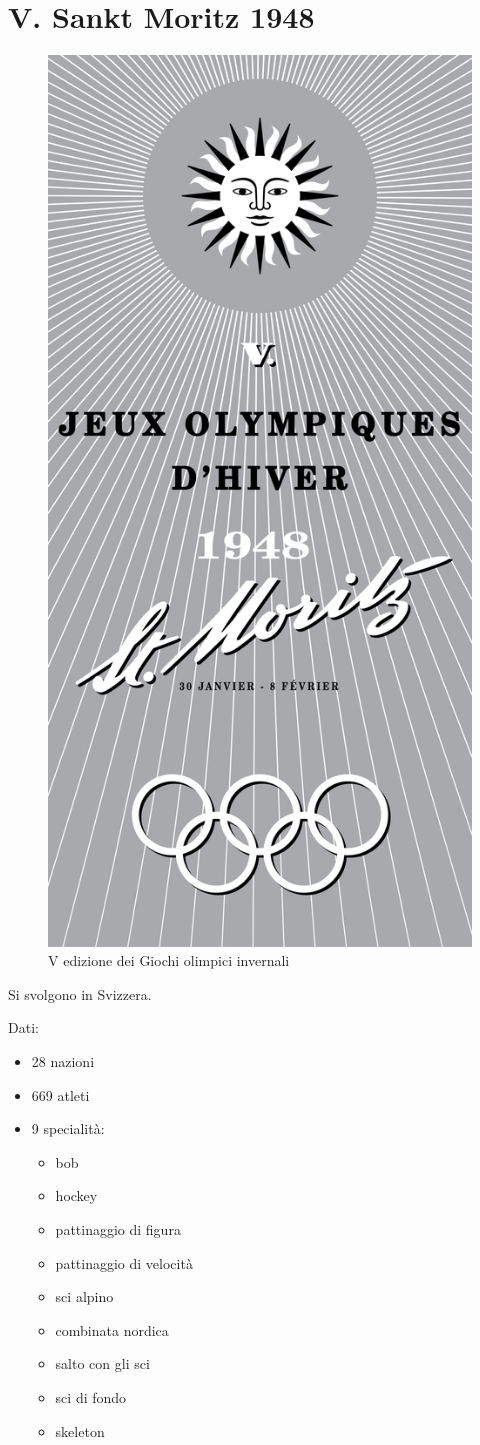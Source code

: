 \documentclass[
]{book}
\providecommand{\tightlist}{%
  \setlength{\itemsep}{0pt}\setlength{\parskip}{0pt}}
\begin{document}
\chapter*{V. Sankt Moritz 1948}\label{v.-sankt-moritz-1948}

\begin{figure}
\includegraphics[width=0.4\linewidth]{images/loghi/1948} \caption{V edizione dei Giochi olimpici invernali}\label{fig:unnamed-chunk-13}
\end{figure}

Si svolgono in Svizzera.

Dati:

\begin{itemize}
\tightlist
\item
  28 nazioni
\item
  669 atleti
\item
  9 specialità:

  \begin{itemize}
  \tightlist
  \item
    bob
  \item
    hockey
  \item
    pattinaggio di figura
  \item
    pattinaggio di velocità
  \item
    sci alpino
  \item
    combinata nordica
  \item
    salto con gli sci
  \item
    sci di fondo
  \item
    skeleton
  \end{itemize}
\end{itemize}
\end{document}

